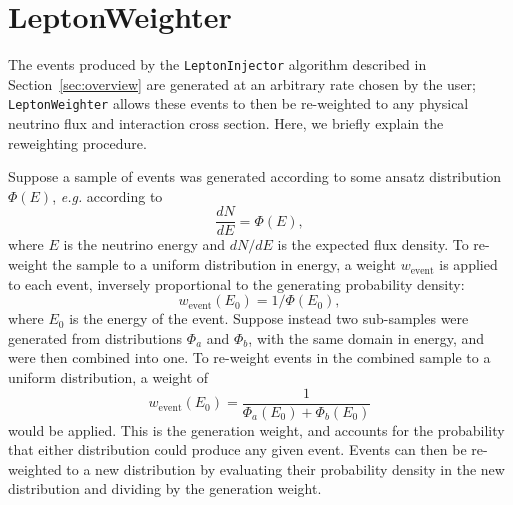 \documentclass[main.tex]{subfiles}
\newcommand{\LeptonInjector}{\texttt{LeptonInjector}}
\newcommand{\LeptonWeighter}{\texttt{LeptonWeighter}}
\begin{document}
\section{LeptonWeighter\label{sec:leptonweighter}}

The events produced by the \LeptonInjector{} algorithm described in Section~\ref{sec:overview} are generated at an arbitrary rate chosen by the user; \LeptonWeighter{} allows these events to then be re-weighted to any physical neutrino flux and interaction cross section.
Here, we briefly explain the reweighting procedure.

Suppose a sample of events was generated according to some ansatz distribution $\Phi(E)$, \textit{e.g.} according to
\begin{equation}
\frac{dN}{dE} = \Phi(E),
\end{equation}
where $E$ is the neutrino energy and $dN/dE$ is the expected flux density.
To re-weight the sample to a uniform distribution in energy, a weight $w_{\textrm{event}}$ is applied to each event, inversely proportional to the generating probability density:
\begin{equation}
w_{\textrm{event}}(E_{0}) = 1/\Phi(E_{0}),
\end{equation}
where $E_0$ is the energy of the event.
Suppose instead two sub-samples were generated from distributions $\Phi_a$ and $\Phi_b$, with the same domain in energy, and were then combined into one.
To re-weight events in the combined sample to a uniform distribution, a weight of 
\begin{equation}
w_{\textrm{event}}(E_{0}) =\dfrac{1}{ \Phi_a(E_{0}) + \Phi_b(E_{0}) }
\end{equation}
would be applied.
This is the generation weight, and accounts for the probability that either distribution could produce any given event. 
Events can then be re-weighted to a new distribution by evaluating their probability density in the new distribution and dividing by the generation weight. 
\end{document}
